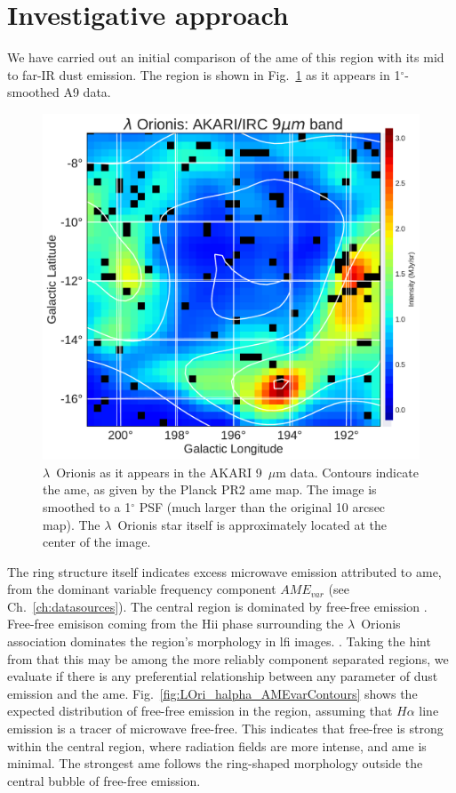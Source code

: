 \section{Investigative approach}
  We have carried out an initial comparison of the \acrshort{ame} of this region with its mid to far-IR dust emission. The region is shown in Fig.~\ref{fig:orionis-akari9} as it appears in 1$^{\circ}$-smoothed A9 data.
      \begin{figure}
        \includegraphics[width=\textwidth]{../Plots/LOri_akari9_AMEcont_1dres.pdf}
        \centering
        \caption{$\lambda$~Orionis as it appears in the AKARI 9~$\mu$m data. Contours indicate the \acrshort{ame}, as given by the Planck PR2 \acrshort{ame} map. The image is smoothed to a 1$^{\circ}$ PSF (much larger than the original 10 arcsec map). The $\lambda$~Orionis star itself is approximately located at the center of the image.}
        \label{fig:orionis-akari9}
      \end{figure}
   The ring structure itself indicates excess microwave emission attributed to \acrshort{ame}, from the dominant variable frequency component $AME_{var}$ (see Ch.~\ref{ch:datasources}). The central region is dominated by free-free emission \citep{aran09, koenig15}. Free-free emisison coming from the Hii phase surrounding the $\lambda$~Orionis association dominates the region's morphology in \acrshort{lfi} images. \citep{planck15XXV}. Taking the hint from \cite{planck15XXV} that this may be among the more reliably component separated regions, we evaluate if there is any preferential relationship between any parameter of dust emission and the \acrshort{ame}. Fig.~\ref{fig:LOri_halpha_AMEvarContours} shows the expected distribution of free-free emission in the region, assuming that $H\alpha$ line emission is a tracer of microwave free-free. This indicates that free-free is strong within the central region, where radiation fields are more intense, and \acrshort{ame} is minimal. The strongest \acrshort{ame} follows the ring-shaped morphology outside the central bubble of free-free emission.
